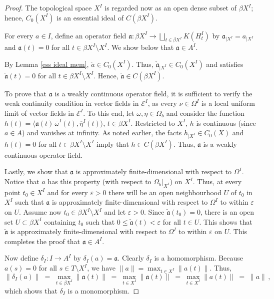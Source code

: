 \documentclass{amsart}
\theoremstyle{definition}
\theoremstyle{remark}
\begin{document}
\begin{proof} The topological space $X^I$ is regarded now as an open dense subset of $\beta X^I$;
hence, $C_0(X^I)$ is an essential ideal of $C(\beta X^I)$.

For every $a\in I$, define an operator field $\mathfrak a: \beta X^I\rightarrow \bigsqcup_{t\in \beta X^I} K(H_t^I)$
by $\mathfrak a_{|X^I}=a_{|X^I}$ and $\mathfrak a(t)=0$ for all $t\in\beta X^I\setminus X^I$. We show below that $\mathfrak a\in A^I$.

By Lemma \ref{ess ideal mem}, $\check{a}\in C_0(X^I)$. Thus,
$\check{\mathfrak a}_{\vert X^I}\in C_0(X^I)$ and satisfies $\check{\mathfrak a}(t)=0$ for all $t\in \beta{X^I}\setminus X^I$.
Hence, $\check{\mathfrak a}\in C(\beta X^I)$.

To prove that $\mathfrak a$ is a weakly continuous operator field, it is sufficient to verify the weak continuity condition in vector fields in $\mathcal E^I$,
as every $\nu\in\Omega^I$ is a local uniform limit of vector fields in $\mathcal E^I$. To this end, let $\omega,\eta\in \Omega_b$ and
consider the function $h(t)=\langle \mathfrak a(t)\,\overline \omega^I(t),\overline \eta^I(t)\rangle$, $t\in\beta X^I$.
Restricted to $X^I$, $h$ is continuous (since $a\in A$) and vanishes at infinity. As noted earlier, the facts $h_{|X^I}\in C_0(X)$ and
$h(t)=0$ for  all $t\in \beta{X^I}\setminus X^I$ imply that $h\in C(\beta X^I)$. Thus, $\mathfrak a$ is a weakly continuous operator field.

Lastly, we show that $\mathfrak a$ is approximately finite-dimensional with respect to $\Omega^I$.
Notice that $a$ has this property (with respect to $\Omega_b|_{X^I}$) on $X^I$. Thus, at every point $t_0\in X^I$ and for every $\varepsilon>0$ there will
be an open neighbourhood $U$ of $t_0$ in $X^I$ such that $\mathfrak a$ is approximately finite-dimensional with respect to $\Omega^I$ to within $\varepsilon$ on $U$.
Assume now $t_0\in \beta X^I\setminus X^I$ and let $\varepsilon>0$. Since $\check{\mathfrak a}(t_0)=0$,
 there is an open set $U\subset\beta X^I$
containing $t_0$ such that $0\le\check{\mathfrak a}(t)<\varepsilon$ for all $t\in U$.
This shows that $\check{\mathfrak a}$ is approximately finite-dimensional with respect to $\Omega^I$ to within $\varepsilon$ on $U$.
This completes the proof that $\mathfrak a\in A^I$.

Now define $\delta_I:I\rightarrow A^I$ by $\delta_I(a)=\mathfrak a$. Clearly $\delta_I$ is a homomorphism. Because $a(s)=0$ for all
$s\in T\setminus X^I$, we have $\|a\|=\max_{t\in X^I}\|a(t)\|$. Thus,
\[
\|\delta_I(a)\|\;=\;\max_{t\in\beta X^I}\|\mathfrak a(t)\|\;=\;
\max_{t\in X^I}\|\mathfrak a(t)\|\;=\; \max_{t\in X^I}\| a(t)\|\;=\; \|a\|\,,
\]
which shows that $\delta_I$ is a monomorphism.


\end{proof}
\end{document}
